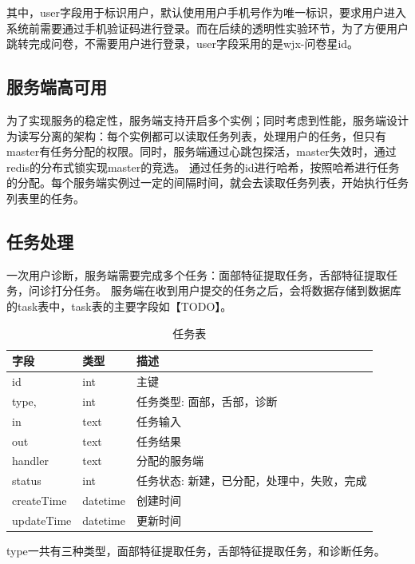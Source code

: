 其中，user字段用于标识用户，默认使用用户手机号作为唯一标识，要求用户进入系统前需要通过手机验证码进行登录。而在后续的透明性实验环节，为了方便用户跳转完成问卷，不需要用户进行登录，user字段采用的是wjx-问卷星id。

\subsection{服务端高可用}
为了实现服务的稳定性，服务端支持开启多个实例；同时考虑到性能，服务端设计为读写分离的架构：每个实例都可以读取任务列表，处理用户的任务，但只有master有任务分配的权限。同时，服务端通过心跳包探活，master失效时，通过redis的分布式锁实现master的竞选。
通过任务的id进行哈希，按照哈希进行任务的分配。每个服务端实例过一定的间隔时间，就会去读取任务列表，开始执行任务列表里的任务。

\subsection{任务处理}
一次用户诊断，服务端需要完成多个任务：面部特征提取任务，舌部特征提取任务，问诊打分任务。
服务端在收到用户提交的任务之后，会将数据存储到数据库的task表中，task表的主要字段如【TODO】。


\begin{table}[]
    \begin{tabular}{lll}
        \toprule
        字段 & 类型 & 描述 \\ 
        \midrule
        id & int & 主键 \\
        type, & int & 任务类型: 面部，舌部，诊断 \\ 
        in & text & 任务输入 \\
        out & text & 任务结果 \\
        handler & text & 分配的服务端 \\
        status & int & 任务状态: 新建，已分配，处理中，失败，完成 \\
        createTime & datetime & 创建时间 \\
        updateTime & datetime & 更新时间\\
        \bottomrule
    \end{tabular}
    \caption{任务表}
    \label{tab:task}
\end{table}

type一共有三种类型，面部特征提取任务，舌部特征提取任务，和诊断任务。

